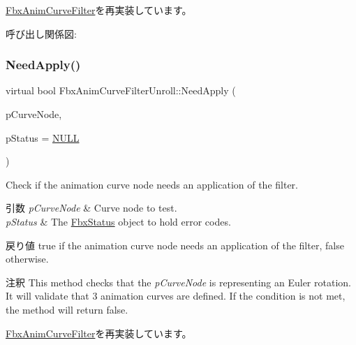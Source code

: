 \hyperlink{class_fbx_anim_curve_filter_a09438dd8d0e9bcb934e6a4b6fc51bcd7}{Fbx\+Anim\+Curve\+Filter}を再実装しています。

呼び出し関係図\+:
\mbox{\label{class_fbx_anim_curve_filter_unroll_ad3df0b89af14237342197a8832e3d94f}} 
\subsubsection{\texorpdfstring{Need\+Apply()}{NeedApply()}\hspace{0.1cm}{\footnotesize\ttfamily [3/5]}}
{\footnotesize\ttfamily virtual bool Fbx\+Anim\+Curve\+Filter\+Unroll\+::\+Need\+Apply (\begin{DoxyParamCaption}\item[{\hyperlink{class_fbx_anim_curve_node}{Fbx\+Anim\+Curve\+Node} \&}]{p\+Curve\+Node,  }\item[{\hyperlink{class_fbx_status}{Fbx\+Status} $\ast$}]{p\+Status = {\ttfamily \hyperlink{fbxarch_8h_a070d2ce7b6bb7e5c05602aa8c308d0c4}{N\+U\+LL}} }\end{DoxyParamCaption})\hspace{0.3cm}{\ttfamily [virtual]}}

Check if the animation curve node needs an application of the filter. 
\begin{DoxyParams}{引数}
{\em p\+Curve\+Node} & Curve node to test. \\
\hline
{\em p\+Status} & The \hyperlink{class_fbx_status}{Fbx\+Status} object to hold error codes. \\
\hline
\end{DoxyParams}
\begin{DoxyReturn}{戻り値}
{\ttfamily true} if the animation curve node needs an application of the filter, {\ttfamily false} otherwise. 
\end{DoxyReturn}
\begin{DoxyRemark}{注釈}
This method checks that the {\itshape p\+Curve\+Node} is representing an Euler rotation. It will validate that 3 animation curves are defined. If the condition is not met, the method will return {\ttfamily false}. 
\end{DoxyRemark}


\hyperlink{class_fbx_anim_curve_filter_a2a88d855d34bb1f2f22ca8386020b33a}{Fbx\+Anim\+Curve\+Filter}を再実装しています。

